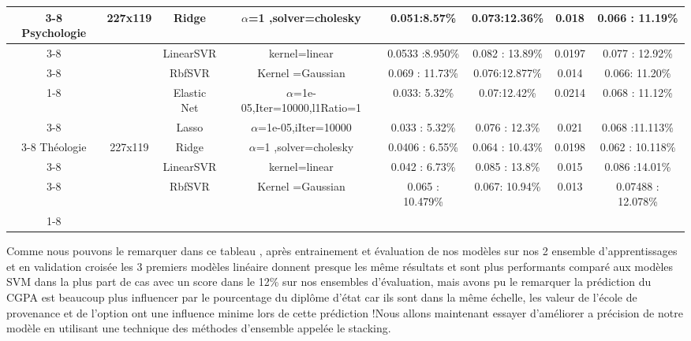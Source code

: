 \begin{table}
{{\begin{tabular}{|c|c|c|c|c|c|c|c|}
		\cline{3-8}
		Psychologie&227x119&Ridge&${\alpha}$=1 ,solver=cholesky&0.051:8.57\% &0.073:12.36\%&0.018& 0.066 : 11.19\%\\
		\cline{3-8}
		&&LinearSVR&kernel=linear&0.0533 :8.950\%&0.082 :  13.89\%&0.0197& 0.077 : 12.92\%\\
		\cline{3-8}
		&&RbfSVR&Kernel =Gaussian&0.069 : 11.73\%&0.076:12.877\%& 0.014&0.066: 11.20\% \\
		\cline{1-8}
		\hline
		\multirow{5}{*}{}
		&&Elastic Net&${\alpha}$=1e-05,Iter=10000,l1Ratio=1&0.033: 5.32\%&0.07:12.42\%&0.0214&0.068 : 11.12\% \\
		\cline{3-8}
		&&Lasso&${\alpha}$=1e-05,iIter=10000&0.033 :  5.32\%&0.076 :  12.3\%&0.021& 0.068 :11.113\%\\
		\cline{3-8}
		Théologie&227x119&Ridge&${\alpha}$=1 ,solver=cholesky&0.0406 : 6.55\% &0.064 : 10.43\%& 0.0198& 0.062 : 10.118\%\\
		\cline{3-8}
		&&LinearSVR&kernel=linear&0.042 : 6.73\%&0.085 : 13.8\%& 0.015&0.086 :14.01\% \\
		\cline{3-8}
		&&RbfSVR&Kernel =Gaussian&0.065 : 10.479\%&0.067: 10.94\%&0.013&0.07488 : 12.078\% \\
		\cline{1-8}
		\hline
	\end{tabular}}}
	\endgroup
\end{table}
\newpage
Comme nous pouvons le remarquer dans ce tableau , après entrainement et évaluation de nos modèles sur nos 2 ensemble d'apprentissages et en validation croisée les 3 premiers modèles linéaire donnent presque les même résultats et sont plus performants comparé aux modèles \ac{SVM} dans la plus part de cas avec un score dans le 12\% sur nos ensembles d'évaluation, mais avons pu le remarquer la prédiction du \ac{CGPA} est beaucoup plus influencer par le pourcentage du diplôme d'état car ils sont dans la même échelle, les valeur de l'école de provenance et de l'option ont une influence minime lors de cette prédiction !Nous allons maintenant essayer d'améliorer a précision de notre modèle en utilisant  une technique des méthodes d'ensemble appelée le stacking.
